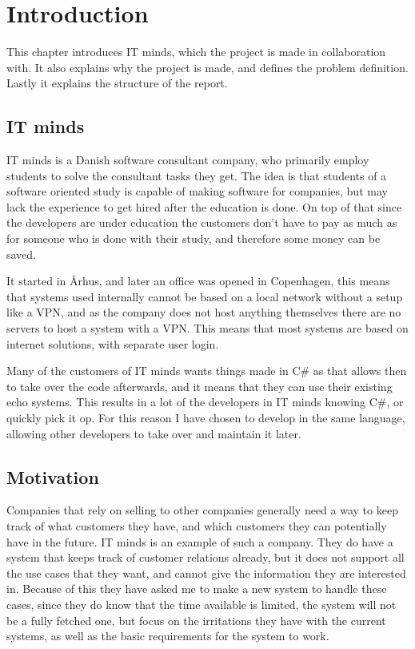 \chapter{Introduction}
\label{chap:Introduction}
This chapter introduces IT minds, which the project is made in collaboration
with. It also explains why the project is made, and defines the problem
definition. Lastly it explains the structure of the report. 

\section{IT minds}
\label{sec:IT minds}
IT minds is a Danish software consultant company\cite{IT-minds}, who primarily
employ students to solve the consultant tasks they get. The idea is that
students of a software oriented study is capable of making software for
companies, but may lack the experience to get hired after the education is done.
On top of that since the developers are under education the customers don't have
to pay as much as for someone who is done with their study, and therefore some
money can be saved. 

It started in Århus, and later an office was opened in Copenhagen, this means
that systems used internally cannot be based on a local network without a setup
like a VPN, and as the company does not host anything themselves there are no
servers to host a system with a VPN. This means that most systems are based on
internet solutions, with separate user login. 

Many of the customers of IT minds wants things made in C\# as that allows then
to take over the code afterwards, and it means that they can use their existing
echo systems. This results in a lot of the developers in IT minds knowing C\#,
or quickly pick it op. For this reason I have chosen to develop in the same
language, allowing other developers to take over and maintain it later. 

\section{Motivation}
\label{sec:Motivation}
Companies that rely on selling to other companies generally need a way to keep
track of what customers they have, and which customers they can potentially have
in the future. IT minds is an example of such a company. They do have a system
that keeps track of customer relations already, but it does not support all the
use cases that they want, and cannot give the information they are interested
in. Because of this they have asked me to make a new system to handle these
cases, since they do know that the time available is limited, the system will
not be a fully fetched one, but focus on the irritations they have with the
current systems, as well as the basic requirements for the system to work. 

